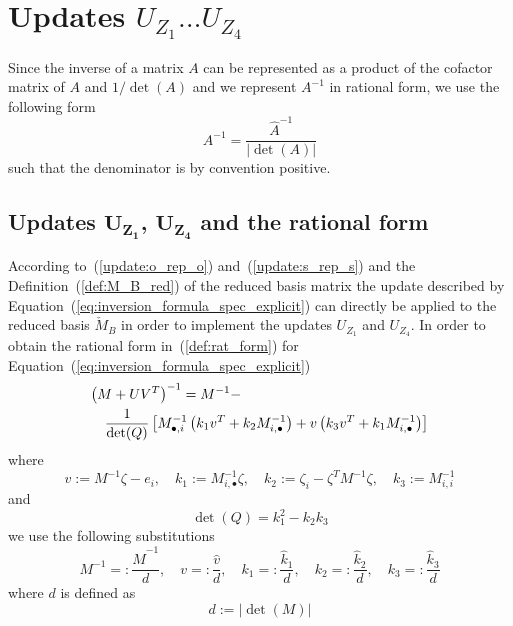 \documentclass[a4paper]{article}
\begin{document}
\section{Updates $U_{Z_{1}} \dots U_{Z_{4}}$}
Since the inverse of a matrix $A$ can be represented as a product of the
cofactor matrix of $A$ and $1/\det(A)$ and we represent $A^{-1}$ in rational
form, we use the following form 
\begin{equation}
\label{def:rat_form}
A^{-1}=\frac{\hat{A}^{-1}}{\left|\det\left(A\right)\right|}
\end{equation}
such that the denominator is by convention positive.

\subsection{Updates $\mathbf{U_{Z_{1}}}$, $\mathbf{U_{Z_{4}}}$ and the rational form}
According to~(\ref{update:o_rep_o}) and~(\ref{update:s_rep_s})
and the Definition~(\ref{def:M_B_red}) of the reduced basis matrix
the update described by Equation~(\ref{eq:inversion_formula_spec_explicit})
can directly be applied to the reduced basis $\check{M}_{B}$
in order to implement
the updates $U_{Z_{1}}$ and $U_{Z_{4}}$. In order to obtain the rational form
in~(\ref{def:rat_form}) for Equation~(\ref{eq:inversion_formula_spec_explicit})
\begin{eqnarray}
\label{def:update_Z1_Z4}
\lefteqn{\left(M+ UV^{T}\right)^{-1}=M^{-1} -} \nonumber \\
& & \frac{1}{\det(Q)}
\left[
  M^{-1}_{\bullet, i}
  \left(k_{1}v^{T} + k_{2}M^{-1}_{i, \bullet}\right)
  +v\left(k_{3}v^{T} + k_{1}M^{-1}_{i, \bullet}\right)
\right]
\end{eqnarray}
where
\begin{equation}
\label{def:update_Z1_Z4_entities}
v:= M^{-1}\zeta-e_{i},
\quad
k_{1}:=M_{i, \bullet}^{-1}\zeta,
\quad
k_{2}:=\zeta_{i} - \zeta^{T}M^{-1}\zeta,
\quad
k_{3}:=M_{i,i}^{-1}
\end{equation}
and
\begin{equation}
\label{eq:det(Q)}
\det(Q)=k_{1}^{2}-k_{2}k_{3}
\end{equation}
we use the following substitutions
\begin{equation}
M^{-1}=:\frac{\hat{M}^{-1}}{d},
\quad
v=:\frac{\hat{v}}{d},
\quad
k_{1}=:\frac{\hat{k}_{1}}{d},
\quad
k_{2}=:\frac{\hat{k}_{2}}{d},
\quad
k_{3}=:\frac{\hat{k}_{3}}{d}
\end{equation}
where $d$ is defined as
\begin{equation}
\label{def:old_denom_Z1_Z4}
d:=\left|\det(M)\right|
\end{equation}
\end{document}
